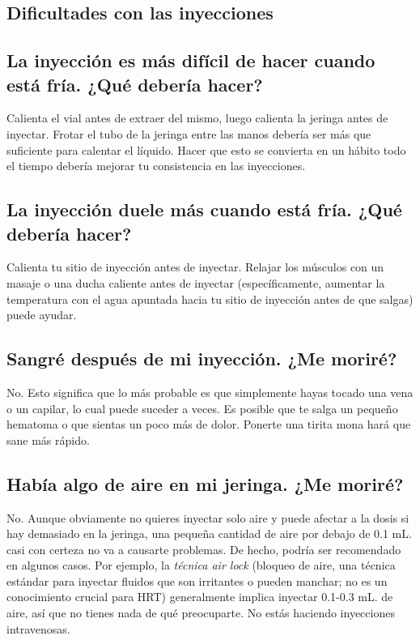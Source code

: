 \documentclass{article}
\begin{document}
\subsection*{Dificultades con las inyecciones}

\subsection{La inyección es más difícil de hacer cuando está fría. ¿Qué debería hacer?}

Calienta el vial antes de extraer del mismo, luego calienta la jeringa antes de inyectar. Frotar el tubo de la jeringa entre las manos debería ser más que suficiente para calentar el líquido. Hacer que esto se convierta en un hábito todo el tiempo debería mejorar tu consistencia en las inyecciones.

\subsection{La inyección duele más cuando está fría. ¿Qué debería hacer?}

Calienta tu sitio de inyección antes de inyectar. Relajar los músculos con un masaje o una ducha caliente antes de inyectar (específicamente, aumentar la temperatura con el agua apuntada hacia tu sitio de inyección antes de que salgas) puede ayudar.

\subsection{Sangré después de mi inyección. ¿Me moriré?}

No. Esto significa que lo más probable es que simplemente hayas tocado una vena o un capilar, lo cual puede suceder a veces. Es posible que te salga un pequeño hematoma o que sientas un poco más de dolor. Ponerte una tirita mona hará que sane más rápido.

\subsection{Había algo de aire en mi jeringa. ¿Me moriré?}\label{7-7}

No. Aunque obviamente no quieres inyectar solo aire y puede afectar a la dosis si hay demasiado en la jeringa, una pequeña cantidad de aire por debajo de 0.1 mL. casi con certeza no va a causarte problemas. De hecho, podría ser recomendado en algunos casos. Por ejemplo, la \textit{técnica air lock} (bloqueo de aire, una técnica estándar para inyectar fluidos que son irritantes o pueden manchar; no es un conocimiento crucial para HRT) generalmente implica inyectar 0.1-0.3 mL. de aire, así que no tienes nada de qué preocuparte. No estás haciendo inyecciones intravenosas.
\end{document}
